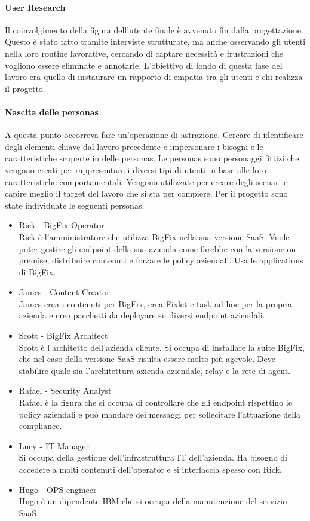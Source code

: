 \paragraph{User Research}
Il coinvolgimento della figura dell'utente finale è avvenuto fin dalla progettazione. Questo è stato fatto tramite interviste strutturate, ma anche osservando gli utenti nella loro routine lavorative, cercando di captare necessità e frustrazioni che vogliono essere eliminate e annotarle. L'obiettivo di fondo di questa fase del lavoro era quello di instaurare un rapporto di empatia tra gli utenti e chi realizza il progetto.

\paragraph{Nascita delle personas}
A questa punto occorreva fare un'operazione di astrazione. Cercare di identificare degli elementi chiave dal lavoro precedente e impersonare i bisogni e le caratteristiche scoperte in delle personas. Le personas sono personaggi fittizi che vengono creati per rappresentare i diversi tipi di utenti in base alle loro caratteristiche comportamentali. Vengono utilizzate per creare degli scenari e capire meglio il target del lavoro che si sta per compiere. Per il progetto sono state individuate le seguenti personas:
\begin{itemize}
	\item Rick - BigFix Operator \\
	Rick è l'amministratore che utilizza BigFix nella sua versione SaaS. Vuole poter gestire gli endpoint della sua azienda come farebbe con la versione on premise, distribuire contenuti e forzare le policy aziendali. Usa le applications di BigFix.
	\item James - Content Creator \\
	James crea i contenuti per BigFix, crea Fixlet e task ad hoc per la propria azienda e crea pacchetti da deployare su diversi endpoint aziendali.
	\item Scott - BigFix Architect \\
	Scott è l'architetto dell'azienda cliente. Si occupa di installare la suite BigFix, che nel caso della versione SaaS risulta essere molto più agevole. Deve stabilire quale sia l'architettura azienda aziendale, relay e la rete di agent.
	\item  Rafael - Security Analyst \\
	Rafael è la figura che si occupa di controllare che gli endpoint rispettino le policy aziendali e può mandare dei messaggi per sollecitare l'attuazione della compliance.
	\item Lucy - IT Manager \\
	Si occupa della gestione dell'infrastruttura IT dell'azienda. Ha bisogno di accedere a molti contenuti dell'operator e si interfaccia spesso con Rick.
	\item Hugo - OPS engineer \\
	Hugo è un dipendente IBM che si occupa della manutenzione del servizio SaaS.
\end{itemize}

